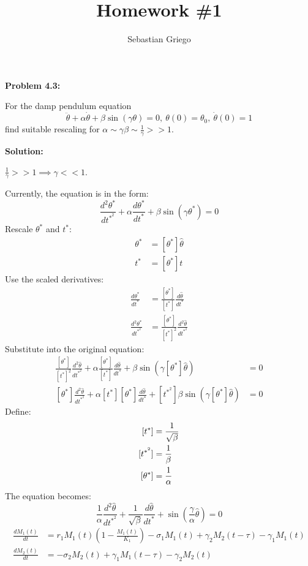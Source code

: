 \documentclass[12pt]{article}
\newenvironment{problem}[1]{
\textbf{Problem #1:}
}{
\rmfamily \vspace{1em}
}
\newenvironment{solution}{
\textbf{Solution:}

}{

\vspace{2em}
}
\begin{document}
\title{Homework \#1}  %
\author{Sebastian Griego}  %

\begin{problem}{4.3}
    For the damp pendulum equation
    \[
        \ddot{\theta} + \alpha \dot{\theta} + \beta \sin(\gamma \theta) = 0, \: \theta(0) = \theta_0, \: \dot{\theta}(0) = 1
    \]
    find suitable rescaling for \(\alpha \sim \gamma \beta \sim \frac{1}{\gamma} > > 1\).
\end{problem}

\begin{solution}
    \(\frac{1}{\gamma} > > 1 \implies \gamma < < 1\).

    Currently, the equation is in the form:
    \[
        \frac{d^2\theta^*}{dt^{*^2}} + \alpha \frac{d\theta^*}{dt^*} + \beta \sin(\gamma \theta^*) = 0
    \]
    Rescale \(\theta^*\) and \(t^*\):
    \[
        \begin{aligned}
            \theta^* &= [\theta^*] \hat{\theta} \\
            t^* &= [\theta^*] t
        \end{aligned}
    \]
    Use the scaled derivatives:
    \[
        \begin{aligned}
            \frac{d\theta^*}{dt^*} &= \frac{[\theta^*]}{[t^*]} \frac{d\hat{\theta}}{dt^*} \\
            \frac{d^2\theta^*}{dt^{*^2}} &= \frac{[\theta^*]}{[t^*]^2} \frac{d^2\hat{\theta}}{dt^{*^2}}
        \end{aligned}
    \]
    Substitute into the original equation:
    \[
        \begin{aligned}
            \frac{[\theta^*]}{[t^*]^2} \frac{d^2\hat{\theta}}{dt^{*^2}} + \alpha \frac{[\theta^*]}{[t^*]} \frac{d\hat{\theta}}{dt^*} + \beta \sin(\gamma [\theta^*] \hat{\theta}) &= 0 \\
            [\theta^*] \frac{d^2\hat{\theta}}{dt^{*^2}} + \alpha [t^*][\theta^*] \frac{d\hat{\theta}}{dt^*} + [t^{*^2}]\beta \sin(\gamma [\theta^*] \hat{\theta}) &= 0
        \end{aligned}
    \]
    Define:
    \[
        \begin{aligned}\relax
            [t^*] &= \frac{1}{\sqrt{\beta}} \\
            [t^{*^2}] &= \frac{1}{\beta} \\
            [\theta^*] &= \frac{1}{\alpha}
        \end{aligned}
    \]
    The equation becomes:
    \[
        \frac{1}{\alpha}\frac{d^2\hat{\theta}}{dt^{*^2}} + \frac{1}{\sqrt{\beta}} \frac{d\hat{\theta}}{dt^*} + \sin(\frac{\gamma}{\alpha} \hat{\theta}) = 0
    \]
    \newpage
    \[
        \begin{aligned}
            \frac{dM_1(t)}{dt} &= r_1 M_1(t) \left(1 - \frac{M_1(t)}{K_1}\right) - \sigma_1 M_1(t) + \gamma_2 M_2(t-\tau) - \gamma_1 M_1(t) \\[10pt]
            \frac{dM_2(t)}{dt} &= -\sigma_2 M_2(t) + \gamma_1 M_1(t-\tau) - \gamma_2 M_2(t)
        \end{aligned}
    \]  
    

\end{solution}
\end{document}

